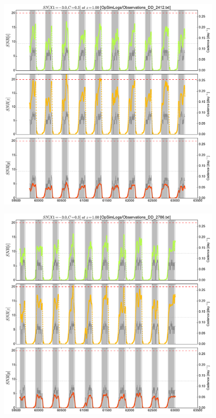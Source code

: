\documentclass[\docopts]{\docclass}
\begin{document}
\begin{figure}[t]
  \begin{center}
    \includegraphics[width=\linewidth]{metric_DD_2412.pdf}
    \caption{}
  \end{center}
\end{figure}

\begin{figure}[t]
  \begin{center}
    \includegraphics[width=\linewidth]{metric_DD_2786.pdf}
    \caption{}
  \end{center}
\end{figure}
\end{document}
